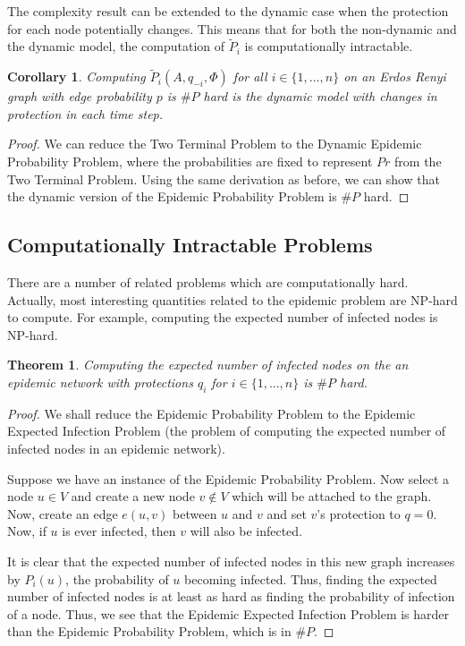 \documentclass{article}
\theoremstyle{plain}
\newtheorem{theorem}{Theorem}
\newtheorem{corollary}{Corollary}
\begin{document}
The complexity result can be extended to the dynamic case when the protection for each node potentially changes. This means that for both the non-dynamic and the dynamic model, the computation of $\tilde{P}_i$ is computationally intractable.

\begin{corollary}
  Computing $\tilde{P}_i(A, q_{-i}, \Phi)$ for all $i \in \{1, \ldots, n\}$ on an Erdos Renyi graph with edge probability $p$ is $\# P$ hard is the dynamic model with changes in protection in each time step.
\end{corollary}
\begin{proof}
  We can reduce the Two Terminal Problem to the Dynamic Epidemic Probability Problem, where the probabilities are fixed to represent $Pr$ from the Two Terminal Problem. Using the same derivation as before, we can show that the dynamic version of the Epidemic Probability Problem is $\# P$ hard.
\end{proof}

\subsection{Computationally Intractable Problems}

There are a number of related problems which are computationally hard. Actually, most interesting quantities related to the epidemic problem are NP-hard to compute. For example, computing the expected number of infected nodes is NP-hard.

\begin{theorem}
  Computing the expected number of infected nodes on the an epidemic network with protections $q_i$ for $i \in \{1, \ldots, n\}$ is $\# P$ hard.
\end{theorem}
\begin{proof}
  We shall reduce the Epidemic Probability Problem to the Epidemic Expected Infection Problem (the problem of computing the expected number of infected nodes in an epidemic network).

  Suppose we have an instance of the Epidemic Probability Problem. Now select a node $u \in V$ and create a new node $v \not \in V$ which will be attached to the graph. Now, create an edge $e(u,v)$ between $u$ and $v$ and set $v$'s protection to $q = 0$. Now, if $u$ is ever infected, then $v$ will also be infected.

  It is clear that the expected number of infected nodes in this new graph increases by $P_i(u)$, the probability of $u$ becoming infected. Thus, finding the expected number of infected nodes is at least as hard as finding the probability of infection of a node. Thus, we see that the Epidemic Expected Infection Problem is harder than the Epidemic Probability Problem, which is in $\# P$.
\end{proof}
\end{document}
